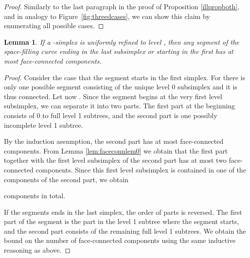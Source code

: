 \documentclass[a4paper,11pt]{article}
\newcommand{\figref}[1]{Figure~\ref{fig:#1}}
\newtheorem{lem}[thm]{Lemma}
\begin{document}
\begin{proof}
  Similarly to the last paragraph in the proof of Proposition \ref{illpropboth},
  and in analogy to \figref{threedcases}, we can show this claim by enumerating
  all possible cases.
\end{proof}
\begin{lem} 
\label{lem:faceconnlem1}
 If a -simplex is uniformly refined to level , then any
 segment of the space-filling curve ending in the last subsimplex or starting in
 the first has at most  face-connected components.
\end{lem}
\begin{proof}
  Consider the case that the segment starts in the first simplex.
  For  there is only one possible segment consisting of the unique level
  0 subsimplex and it is thus connected.
  Let now .
  Since the segment begins at the very first level  subsimplex, we can
  separate it into two parts.
  The first part at the beginning consists of 0 to  full level 1 subtrees,
  and the second part is one possibly incomplete level 1 subtree.

  By the induction assumption, the second part has at most  face-connected
  components.
  From Lemma \ref{lem:faceconnlem0} we obtain that the first part
  together with the first level  subsimplex of the second part has at most
  two face-connected components.
  Since this first level  subsimplex is contained in one of the components
  of the second part, we obtain
  
  components in total.

  If the segments ends in the last simplex, the order of parts is reversed.
  The first part of the segment is the part in the level 1 subtree where
  the segment starts, and the second part consists of the remaining full
  level 1 subtrees.
  We obtain the bound on the number of face-connected components using the same
  inductive reasoning as above.
\end{proof}
\end{document}
